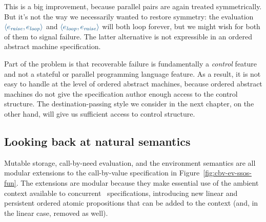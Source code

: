 \smallskip
{}
\smallskip

\noindent
This is a big improvement, because parallel pairs are again treated
symmetrically. But it's not the way we necessarily wanted to restore
symmetry: the evaluation $\obj{\langle e_{\it raise}, e_{\it loop} \rangle}$
and $\obj{\langle e_{\it loop}, e_{\it raise} \rangle}$ will both loop
forever, but we might wish for both of them to signal failure. The
latter alternative is not expressible in an ordered abstract machine
specification.

Part of the problem is that recoverable failure is fundamentally a
{\it control} feature and not a stateful or parallel programming
language feature. As a result, it is not easy to handle at the level
of ordered abstract machines, because ordered abstract machines do not
give the specification author enough access to the control
structure. The destination-passing style we consider in the next
chapter, on the other hand, 
will give us sufficient access to control structure.


\subsection{Looking back at natural semantics}
\label{sec:enriching-natsem}

Mutable storage, call-by-need evaluation, and the environment
semantics are all modular extensions to the call-by-value
specification in Figure~\ref{fig:cbv-ev-ssos-fun}.  The extensions are
modular because they make essential use of the ambient context
available to concurrent \sls~specifications, introducing new linear
and persistent ordered atomic propositions that can be added to the
context (and, in the linear case, removed as well).

